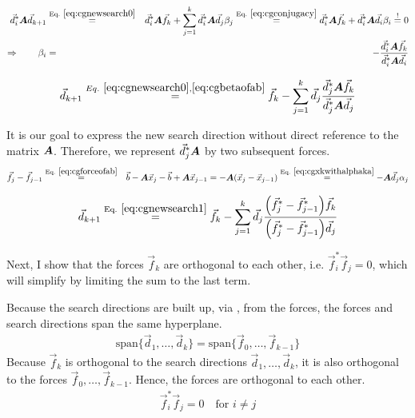 \documentclass[11pt,a4paper]{report}
\begin{document}
\begin{eqnarray}
\vec{d}^*_i\mat{A}\vec{d}_{k+1}&\eqrel{eq:cgnewsearch0}{=}&
\vec{d}^*_i\mat{A}\vec{f}_k
+\sum_{j=1}^{k}\vec{d}^*_i\mat{A}\vec{d}_j\beta_j 
\eqrel{eq:cgconjugacy}{=}
\vec{d}^*_i\mat{A}\vec{f}_k
+\vec{d}^*_i\mat{A}\vec{d}_i\beta_i\stackrel{!}{=}0
\nonumber\\
\Rightarrow\qquad
\beta_i&=&-\frac{\vec{d}^*_i\mat{A}\vec{f}_k}{\vec{d}^*_i\mat{A}\vec{d}_i}
\label{eq:cgbetaofab}
\end{eqnarray}

\begin{eqnarray}
\vec{d}_{k+1}
\stackrel{Eq.~\ref{eq:cgnewsearch0},\ref{eq:cgbetaofab}}{=}
\vec{f}_k-\sum_{j=1}^{k}\vec{d}_j
\frac{\vec{d}^*_j\bm{A}\vec{f}_k}{\vec{d}^*_j\bm{A}\vec{d}_j}
\label{eq:cgnewsearch1}
\end{eqnarray}

It is our goal to express the new search direction without direct
reference to the matrix $\bm{A}$. Therefore, we represent
$\vec{d}^*_j\bm{A}$ by two subsequent forces.
\begin{eqnarray}
\vec{f}_j-\vec{f}_{j-1}&\eqrel{eq:cgforceofab}{=}&
\vec{b}-\mat{A}\vec{x}_j-\vec{b}+\mat{A}\vec{x}_{j-1}
=-\mat{A}(\vec{x}_j-\vec{x}_{j-1})
\eqrel{eq:cgxkwithalphaka}{=}
-\mat{A}\vec{d}_j\alpha_j
\end{eqnarray}


\begin{eqnarray}
\vec{d}_{k+1}\eqrel{eq:cgnewsearch1}{=}\vec{f}_k
-\sum_{j=1}^{k}\vec{d}_j
\frac{\Bigl(\vec{f}_j^*-\vec{f}_{j-1}^*\Bigr)\vec{f}_k}
{\Bigl(\vec{f}_j^*-\vec{f}_{j-1}^*\Bigr)\vec{d}_j}
\label{eq:cgnewsearch2}
\end{eqnarray}

Next, I show that the forces $\vec{f}_k$ are orthogonal to each other,
i.e. $\vec{f}_i^*\vec{f}_j=0$, which will simplify
 by limiting the sum to the last term.

Because the search directions are built up, via
, from the forces, the forces and search
directions span the same hyperplane.
\begin{eqnarray}
\text{span}\{\vec{d}_1,\ldots,\vec{d}_k\}=
\text{span}\{\vec{f}_0,\ldots,\vec{f}_{k-1}\}
\end{eqnarray}
Because $\vec{f}_k$ is orthogonal to the search directions
$\vec{d}_1,\ldots,\vec{d}_k$, it is also orthogonal to the forces
$\vec{f}_0,\ldots,\vec{f}_{k-1}$. Hence, the forces are orthogonal to
each other.
\begin{eqnarray}
\vec{f}_i^*\vec{f}_j=0\quad\text{for $i\neq j$}
\label{eq:cgorthogonalityforces}
\end{eqnarray}
\end{document}
